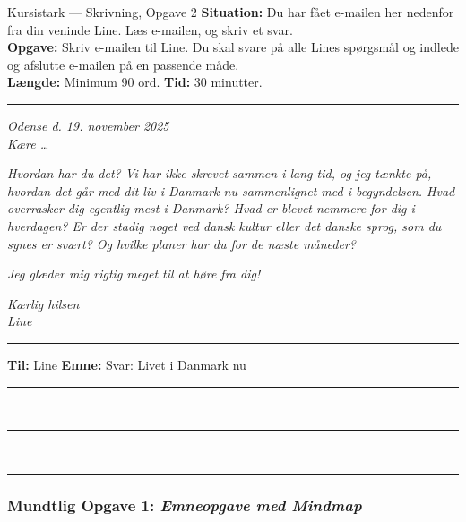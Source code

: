 \begin{emailbox}{Kursistark --- Skrivning, Opgave 2}
\textbf{Situation:} Du har fået e-mailen her nedenfor fra din veninde Line. Læs e-mailen, og skriv et svar.\\
\textbf{Opgave:} Skriv e-mailen til Line. Du skal svare på alle Lines spørgsmål og indlede og afslutte e-mailen på en passende måde.\\
\textbf{Længde:} Minimum 90 ord. \qquad \textbf{Tid:} 30 minutter.

\vspace{0.2em}
\hrule
\vspace{0.2em}
\hfill\textit{Odense d. 19. november 2025}\\[2pt]
\textit{Kære \ldots}

\vspace{0.15em}
\textit{Hvordan har du det? Vi har ikke skrevet sammen i lang tid, og jeg tænkte på, hvordan det går med dit liv i Danmark nu sammenlignet med i begyndelsen. Hvad overrasker dig egentlig mest i Danmark? Hvad er blevet nemmere for dig i hverdagen? Er der stadig noget ved dansk kultur eller det danske sprog, som du synes er svært? Og hvilke planer har du for de næste måneder?}

\vspace{0.15em}
\textit{Jeg glæder mig rigtig meget til at høre fra dig!}

\vspace{0.15em}
\textit{Kærlig hilsen\\
Line}

\vspace{0.15em}
\hrule
\vspace{0.15em}
\textbf{Til:} Line \qquad \textbf{Emne:} Svar: Livet i Danmark nu\\[2pt]
\rule{\linewidth}{0.4pt}\\[2pt]
\rule{\linewidth}{0.4pt}\\[2pt]
\rule{\linewidth}{0.4pt}
\end{emailbox}

\clearpage
{}

\subsubsection*{Mundtlig Opgave 1: \textit{Emneopgave med Mindmap}}

